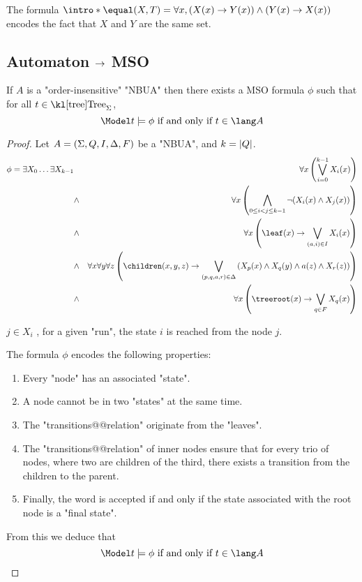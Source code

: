 \documentclass{article}
\begin{document}
\begin{example}
	The formula $\intro* \equal (X,T) = \forall x,  (X(x) \ra Y(x)) \land (Y(x) \ra X(x))$ encodes the fact that $X$ and $Y$ are the same set.
\end{example}

\subsection{Automaton $\rightarrow$ MSO}

\begin{lemma}
	If $A$ is a "order-insensitive" "NBUA"  then there exists a MSO formula $\phi$ such that for all $t \in \tree_{\Sigma}$,
	\[ \Model t \models \phi \tiff t \in \lang A \]
\end{lemma}

\begin{proof}
	Let $A = (\Sigma, Q, I, \Delta, F)$ be a "NBUA", and $k = \left|Q\right|$.
	\begin{eqnarray}
		\phi = \exists X_0 \ldots \exists X_{k-1} &\ & \forall x \left( \bigvee_{i=0}^{k-1} X_i(x) \right) \label{lem:AMSO1} \\
		&\land& \forall x \left( \bigwedge_{0 \leq i < j \leq k-1}  \lnot (X_i(x) \land X_j(x)) \right) \label{lem:AMSO2} \\
		&\land& \forall x  \left( \leaf (x) \ra \bigvee_{(a,i)\in I}  X_i(x) \right) \label{lem:AMSO3} \\
		&\land& \forall x \forall y \forall z \left(\children(x,y,z) \ra \bigvee_{(p,q,a,r)\in \Delta} \left(X_p(x) \land X_q(y) \land a(z) \land X_r(z)\right)\right) \label{lem:AMSO4} \\
		&\land& \forall x \left(\treeroot (x) \ra \bigvee_{q \in F} X_q(x) \right) \label{lem:AMSO5}
	\end{eqnarray}


	$j \in X_i$ \tiff, for a given "run", the state $i$ is reached from the node $j$.

	The formula $\phi$ encodes the following properties:

	\begin{enumerate}
		\item Every "node" has an associated "state".
		\item A node cannot be in two "states" at the same time.
		\item The "transitions@@relation" originate from the "leaves".
		\item The "transitions@@relation" of inner nodes ensure that for every trio of nodes, where two are children of the third, there exists a transition from the children to the parent.
		\item Finally, the word is accepted if and only if the state associated with the root node is a "final state".
	\end{enumerate}

	From this we deduce that
	\[ \Model t \models \phi \tiff t \in \lang A \]
\end{proof}
\end{document}
